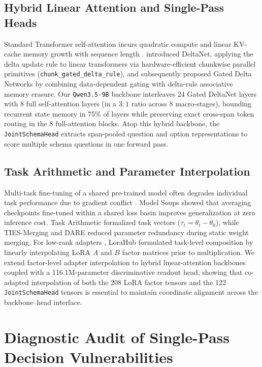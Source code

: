 \documentclass[10pt,twocolumn]{article}
\begin{document}
\subsection{Hybrid Linear Attention and Single-Pass Heads}
Standard Transformer self-attention incurs quadratic compute and linear KV-cache memory growth with sequence length \citep{dao2022flashattention}. \citet{yang2024deltanet} introduced DeltaNet, applying the delta update rule to linear transformers via hardware-efficient chunkwise parallel primitives (\texttt{chunk\_gated\_delta\_rule}), and subsequently proposed Gated Delta Networks \citep{yang2025gateddeltanet} by combining data-dependent gating with delta-rule associative memory erasure. Our \texttt{Qwen3.5-9B} backbone interleaves 24 Gated DeltaNet layers with 8 full self-attention layers (in a $3:1$ ratio across 8 macro-stages), bounding recurrent state memory in 75\% of layers while preserving exact cross-span token routing in the 8 full-attention blocks. Atop this hybrid backbone, the \texttt{JointSchemaHead} \citep{cloudflare2026clef} extracts span-pooled question and option representations to score multiple schema questions in one forward pass.

\subsection{Task Arithmetic and Parameter Interpolation}
Multi-task fine-tuning of a shared pre-trained model often degrades individual task performance due to gradient conflict \citep{ilharco2023taskarithmetic}. Model Soups \citep{wortsman2022modelsoups} showed that averaging checkpoints fine-tuned within a shared loss basin improves generalization at zero inference cost. Task Arithmetic \citep{ilharco2023taskarithmetic} formalized task vectors ($\tau_t = \theta_t - \theta_0$), while TIES-Merging \citep{yadav2023ties} and DARE \citep{yu2024dare} reduced parameter redundancy during static weight merging. For low-rank adapters \citep{hu2022lora}, LoraHub \citep{huang2024lorahub} formulated task-level composition by linearly interpolating LoRA $A$ and $B$ factor matrices prior to multiplication. We extend factor-level adapter interpolation to hybrid linear-attention backbones coupled with a 116.1M-parameter discriminative readout head, showing that co-adapted interpolation of both the 208 LoRA factor tensors and the 122 \texttt{JointSchemaHead} tensors is essential to maintain coordinate alignment across the backbone--head interface.

\section{Diagnostic Audit of Single-Pass Decision Vulnerabilities}
\label{sec:audit}
\end{document}
